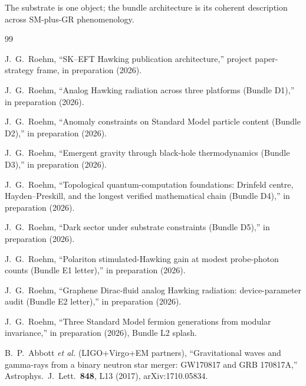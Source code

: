 \documentclass[aps,prd,reprint,nofootinbib,superscriptaddress]{revtex4-2}
\begin{document}
The substrate is one object; the bundle architecture is its
coherent description across SM-plus-GR phenomenology.


\begin{thebibliography}{99}



J.~G.~Roehm,
``SK--EFT Hawking publication architecture,''
project paper-strategy frame, in preparation (2026).

J.~G.~Roehm,
``Analog Hawking radiation across three platforms (Bundle D1),''
in preparation (2026).

J.~G.~Roehm,
``Anomaly constraints on Standard Model particle content (Bundle D2),''
in preparation (2026).

J.~G.~Roehm,
``Emergent gravity through black-hole thermodynamics (Bundle D3),''
in preparation (2026).

J.~G.~Roehm,
``Topological quantum-computation foundations: Drinfeld centre,
Hayden--Preskill, and the longest verified mathematical chain
(Bundle D4),''
in preparation (2026).

J.~G.~Roehm,
``Dark sector under substrate constraints (Bundle D5),''
in preparation (2026).

J.~G.~Roehm,
``Polariton stimulated-Hawking gain at modest probe-photon counts
(Bundle E1 letter),''
in preparation (2026).

J.~G.~Roehm,
``Graphene Dirac-fluid analog Hawking radiation: device-parameter
audit (Bundle E2 letter),''
in preparation (2026).

J.~G.~Roehm,
``Three Standard Model fermion generations from modular invariance,''
in preparation (2026), Bundle L2 splash.


B.~P.~Abbott \emph{et al.} (LIGO+Virgo+EM partners),
``Gravitational waves and gamma-rays from a binary neutron star merger:
GW170817 and GRB 170817A,''
Astrophys.\ J.\ Lett.\ \textbf{848}, L13 (2017),
arXiv:1710.05834.


\end{thebibliography}
\end{document}
